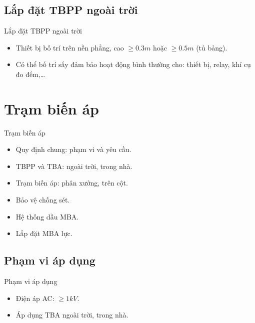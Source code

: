 \documentclass[20pt]{beamer}
\begin{document}
\subsection*{Lắp đặt TBPP ngoài trời}
\begin{frame}{Lắp đặt TBPP ngoài trời}
	\begin{itemize}
	\justifying
		\item Thiết bị \alert{bố trí trên nền phẳng}, cao $\geq 0.3m$ hoặc $\geq 0.5m$ (tủ bảng).
		\item Có thể \alert{bố trí sấy} đảm bảo hoạt động bình thường cho: thiết bị, relay, khí cụ đo đếm,\ldots
	\end{itemize}
\end{frame}
\section{Trạm biến áp}
\begin{frame}{Trạm biến áp}
	\begin{itemize}
	\justifying
		\item Quy định chung: phạm vi và yêu cầu.
		
		\item TBPP và TBA: ngoài trời, trong nhà.
		
		\item Trạm biến áp: phân xưởng, trên cột.
		\item Bảo vệ chống sét.
		
		\item Hệ thống dầu MBA.
		
		\item Lắp đặt MBA lực.
	\end{itemize}
\end{frame}


\subsection*{Phạm vi áp dụng}
\begin{frame}{Phạm vi áp dụng}
	\begin{itemize}
	\justifying
		\item Điện áp AC: $\geq 1kV$.
		
		\item Áp dụng TBA ngoài trời, trong nhà.	
	\end{itemize}
\end{frame}
\end{document}
